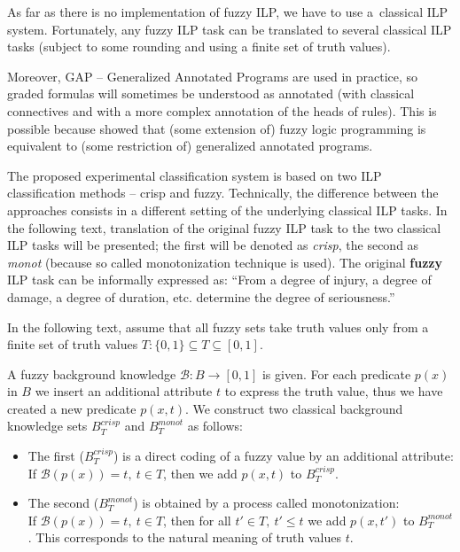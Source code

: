 As far as there is no implementation of fuzzy ILP, we have to use a~classical ILP system. Fortunately, any fuzzy ILP task can be translated to several classical ILP tasks (subject to some rounding and using a finite set of truth values).

Moreover, GAP -- Generalized Annotated Programs \citep{Kifer:1992:TGA:139720.139723} are used in practice, so graded formulas will sometimes be understood as annotated (with classical connectives and with a more complex annotation of the heads of rules). This is possible because \cite{biblio:KLV} showed that (some extension of) fuzzy logic programming is equivalent to (some restriction of) generalized annotated programs. 

The proposed experimental classification system is based on two ILP classification methods -- crisp and fuzzy. 
Technically, the difference between the approaches consists in a different setting of the underlying classical ILP tasks. 
In the following text, translation of the original fuzzy ILP task to the two classical ILP tasks will be presented; the first will be denoted as \emph{crisp}, the second as \emph{monot} (because so called monotonization technique is used). The original \textbf{fuzzy} ILP task can be informally expressed as: ``From a degree of injury, a degree of damage, a degree of duration, etc. determine the degree of seriousness.''   

\bigskip
In the following text, assume that all fuzzy sets take truth values only from a finite set of truth values $T: \{0,1\}\subseteq T\subseteq [0,1]$.

\begin{definition}
A fuzzy background knowledge ${\mathcal B}:B\longrightarrow [0,1]$ is given. For each predicate $p(x)$ in $B$ we insert an additional attribute $t$ to express the truth value, thus we have created a new predicate $p(x,t)$. We construct two classical background knowledge sets $B^{crisp}_T$ and $B^{monot}_T$  as follows:

\begin{itemize}
	\item The first ($B^{crisp}_T$) is a direct coding of a fuzzy value by an additional attribute:
\\If ${\mathcal B}(p(x))=t,\  t \in T$, then we add $p(x,t)$ to  ${B}^{crisp}_T$.
	\item The second ($B^{monot}_T$) is obtained by a process called monotonization:
\\If ${\mathcal B}(p(x))=t,\  t \in T$, then for all $t'\in T,\  t'\le t$ we add $p(x,t')$ to ${B}^{monot}_T$.
This corresponds to the natural meaning of truth values $t$.
\end{itemize}
\end{definition}



